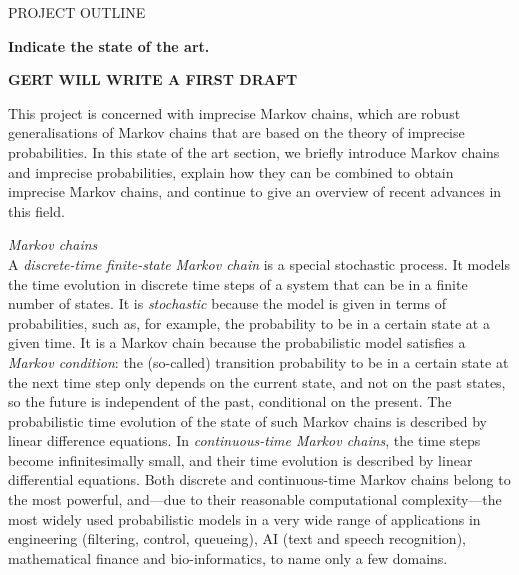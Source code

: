 \documentclass[11pt,dvipsnames,usenames,a4paper]{article}
\begin{document}

\newpage
{}

\setcounter{page}{1}

\begin{shaded}\centering PROJECT OUTLINE \end{shaded}


\textbf{Indicate the state of the art.}


{\color{blue}\bf GERT WILL WRITE A FIRST DRAFT}

This project is concerned with imprecise Markov chains, which are robust generalisations of Markov chains that are based on the theory of imprecise probabilities. In this state of the art section, we briefly introduce Markov chains and imprecise probabilities, explain how they can be combined to obtain imprecise Markov chains, and continue to give an overview of recent advances in this field.

\emph{Markov chains}\\[5pt]
A \emph{discrete-time} \emph{finite-state} \emph{Markov chain} is a special stochastic process. 
It models the time evolution in discrete time steps of a system that can be in a finite number of states.
It is \emph{stochastic} because the model is given in terms of probabilities, such as, for example, the probability to be in a certain state at a given time.
It is a Markov chain because the probabilistic model satisfies a \emph{Markov condition}: the (so-called) transition probability to be in a certain state at the next time step only depends on the current state, and not on the past states, so the future is independent of the past, conditional on the present.
The probabilistic time evolution of the state of such Markov chains is described by linear difference equations.
In \emph{continuous-time Markov chains}, the time steps become infinitesimally small, and their time evolution is described by linear differential equations. 
Both discrete and continuous-time Markov chains belong to the most powerful, and---due to their reasonable computational complexity---the most widely used probabilistic models in a very wide range of applications in engineering (filtering, control, queueing), AI (text and speech recognition), mathematical finance and bio-informatics, to name only a few domains.
\end{document}
